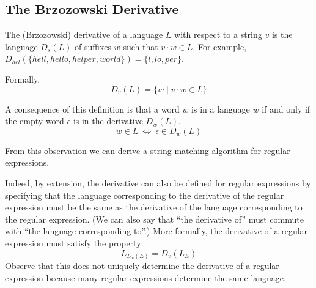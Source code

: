 \subsection{The Brzozowski Derivative}

The (Brzozowski) derivative of a language $L$ with respect to a string
$v$ is the language $D_s(L)$ of suffixes $w$ such that $v \cdot w \in L$.
For example, $D_{\mathit{hel}}(\{\mathit{hell}, \mathit{hello},\mathit{helper},\mathit{world}\}) = 
\{ \mathit{l}, \mathit{lo}, \mathit{per} \}$.

Formally,
\begin{equation*}
D_v(L) = \{ w \mid v \cdot w \in L \}
\end{equation*}

A consequence of this definition is that a word $w$ is in a language $w$ if and only if
the empty word $\epsilon$ is in the derivative $D_w(L)$.
\begin{equation*}
w \in L ~\Leftrightarrow~ \epsilon \in D_w(L)
\end{equation*}

From this observation we can derive a string matching algorithm for regular
expressions.

Indeed, by extension, the derivative can also be defined for regular
expressions by specifying that the language corresponding to the derivative of
the regular expression must be the same as the derivative of the language
corresponding to the regular expression.  (We can also say that ``the
derivative of'' must commute with ``the language corresponding to''.) More
formally, the derivative of a regular expression must satisfy the property:
\begin{equation}\label{eq:deriv_re:spec}
L_{D_v(E)} = D_v(L_E)
\end{equation}
Observe that this does not uniquely determine the derivative of a regular
expression because many regular expressions determine the same language.

